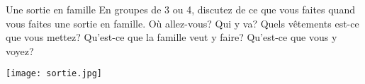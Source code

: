 \begin{frame}{Une sortie en famille}
  En groupes de 3 ou 4, discutez de ce que vous \alert{faites} quand vous faites une sortie en famille.
  Où \alert{allez}-vous?
  Qui y \alert{va}?
  Quels vêtements est-ce que vous \alert{mettez}?
  Qu'est-ce que la famille \alert{veut} y faire?
  Qu'est-ce que vous y \alert{voyez}?
  \begin{center}
    \texttt{[image: sortie.jpg]}
  \end{center}
\end{frame}